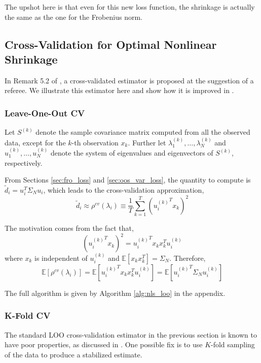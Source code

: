 \documentclass{article}
\begin{document}
The upshot here is that even for this new loss function, the shrinkage is
actually the same as the one for the Frobenius norm.

\subsection{Cross-Validation for Optimal Nonlinear Shrinkage}

In Remark 5.2 of \cite{Ledoit2012Nonlinear}, a cross-validated estimator is
proposed at the suggestion of a referee.  We illustrate this estimator here and
show how it is improved in \cite{Bartz2016CrossValidation}.

\subsubsection{Leave-One-Out CV}\label{sec:loo}

Let $S^{(k)}$ denote the sample covariance matrix computed from all the observed
data, except for the $k$-th observation $x_k$.  Further let $\lambda_1^{(k)},
\ldots, \lambda_N^{(k)}$ and $u_1^{(k)}, \ldots, u_N^{(k)}$ denote the system of
eigenvalues and eigenvectors of $S^{(k)}$, respectively.

From Sections \ref{sec:fro_loss} and \ref{sec:oos_var_loss}, the quantity to
compute is $\tilde{d}_i= u_i^T \Sigma_N u_i$, which leads to the 
cross-validation approximation,
\begin{equation}\label{eq:rho_cv}
	\tilde{d}_i \approx \rho^{cv}(\lambda_i) 
		\equiv \frac1T \sum_{k=1}^T ({u_i^{(k)}}^T x_k)^2
\end{equation}

The motivation comes from the fact that,
$$
	({u_i^{(k)}}^T x_k)^2 = {u_i^{(k)}}^T x_k x_k^T u_i^{(k)} 
$$
where $x_k$ is independent of $u_i^{(k)}$ and $\mathbb{E}\left[x_k x_k^T\right]
= \Sigma_N$. Therefore,
$$
	\mathbb{E}\left[\rho^{cv}(\lambda_i)\right]
		 = \mathbb{E}\left[{u_i^{(k)}}^T x_k x_k^T u_i^{(k)}\right]
		 = \mathbb{E}\left[{u_i^{(k)}}^T \Sigma_N u_i^{(k)}\right]
$$

The full algorithm is given by Algorithm \ref{alg:nls_loo} in the appendix.



\subsubsection{K-Fold CV}\label{sec:kcv}

The standard LOO cross-validation estimator in the previous section is known to
have poor properties, as discussed in \cite{Bartz2016CrossValidation}.  One
possible fix is to use $K$-fold sampling of the data to produce a stabilized
estimate.  
\end{document}
